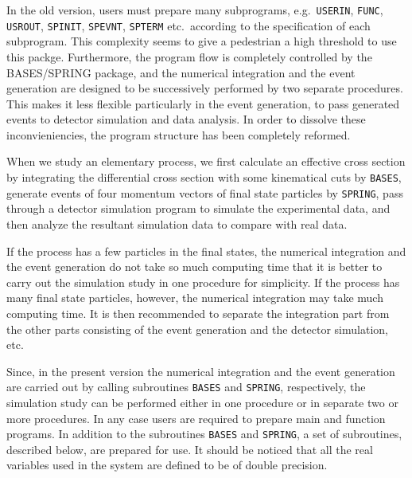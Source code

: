 \vskip 1.0cm
\bigskip
In  the old version, users must prepare many subprograms,
e.g.~{\tt USERIN}, {\tt FUNC}, {\tt USR\-OUT}, {\tt SP\-INIT}, {\tt SP\-EVNT},
{\tt SP\-TERM} etc.~according to the specification of each subprogram.
This complexity seems to give a pedestrian a high threshold to use this packge.
Furthermore, the program flow is completely controlled by the {\small BASES/SPRING}
package, and the numerical integration and the event generation are designed to be
successively performed by two separate procedures.  This makes it less
flexible particularly in the event generation, to pass generated events to
detector simulation and data analysis. In order to dissolve these
inconvieniencies, the program structure has been completely reformed.
 \par
\bigskip
{}
\par\medskip
When we study an elementary process, we first calculate an effective cross
section by integrating the differential cross section with some kinematical cuts
by {\tt BASES}, generate events of four momentum vectors of final state particles
by {\tt SPRING}, pass through a detector simulation program to simulate the
experimental data, and then analyze the resultant
simulation data to compare with real data. 
\par\noindent
If the process has  a few particles in the final states, the numerical
integration and the event generation do not take so much computing time that it
is better to carry out the simulation study in one procedure for simplicity.
If the process has many final state particles, however, the
numerical integration may take much computing time.  It is then recommended to
separate the integration part from the other parts consisting of the event
generation and the detector simulation, etc.
\par\noindent 
Since, in the present version the numerical integration and the event generation
are carried out by calling subroutines {\tt BASES} and {\tt SPRING}, respectively,
the simulation study can be performed either in one procedure or in separate two
or more procedures.
In any case users are required to prepare main and function programs.
In addition to the subroutines {\tt BASES} and {\tt SPRING}, a set of subroutines,
described below, are prepared for use.
It should be noticed that all the real variables used in the system are defined to be
of double precision.
\par
